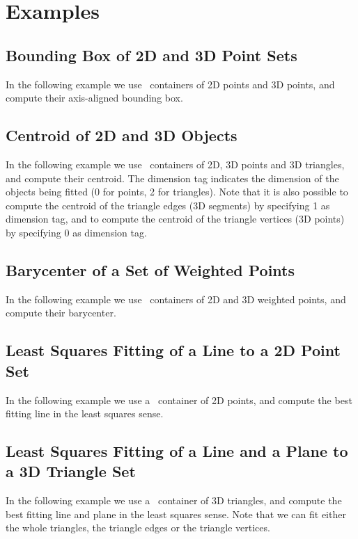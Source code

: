 \section{Examples\label{subsec:pca_examples}}

\subsection{Bounding Box of 2D and 3D Point Sets}
In the following example we use \stl\ containers of 2D points and 3D points, and compute their axis-aligned bounding box. 

\subsection{Centroid of 2D and 3D Objects}
In the following example we use \stl\ containers of 2D, 3D points and 3D triangles, and compute their centroid. The dimension tag indicates the dimension of the objects being fitted (0 for points, 2 for triangles). Note that it is also possible to compute the centroid of the triangle edges (3D segments) by specifying 1 as dimension tag, and to compute the centroid of the triangle vertices (3D points) by specifying 0 as dimension tag. 

\subsection{Barycenter of a Set of Weighted Points}
In the following example we use \stl\ containers of 2D and 3D weighted points, and compute their barycenter.  

\subsection{Least Squares Fitting of a Line to a 2D Point Set}
In the following example we use a \stl\ container of 2D points, and compute the best fitting line in the least squares sense. 

\subsection{Least Squares Fitting of a Line and a Plane to a 3D Triangle Set}
In the following example we use a \stl\ container of 3D triangles, and compute the best fitting line and plane in the least squares sense. Note that we can fit either the whole triangles, the triangle edges or the triangle vertices.

